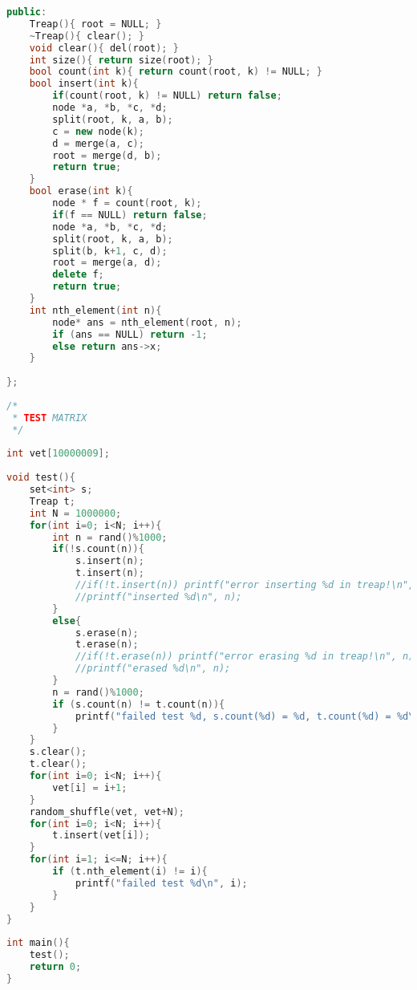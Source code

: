 \documentclass[12pt,a4paper,twoside]{report}
\begin{document}
\begin{lstlisting}[caption=Treap,language=C++]
public:
    Treap(){ root = NULL; }
    ~Treap(){ clear(); }
    void clear(){ del(root); }
    int size(){ return size(root); }
    bool count(int k){ return count(root, k) != NULL; }
    bool insert(int k){
        if(count(root, k) != NULL) return false;
        node *a, *b, *c, *d;
        split(root, k, a, b);
        c = new node(k);
        d = merge(a, c);
        root = merge(d, b);
        return true;
    }
    bool erase(int k){
        node * f = count(root, k);
        if(f == NULL) return false;
        node *a, *b, *c, *d;
        split(root, k, a, b);
        split(b, k+1, c, d);
        root = merge(a, d);
        delete f;
        return true;
    }
    int nth_element(int n){
        node* ans = nth_element(root, n);
        if (ans == NULL) return -1;
        else return ans->x;
    }
 
};
 
/*
 * TEST MATRIX
 */
 
int vet[10000009];
 
void test(){
    set<int> s;
    Treap t;
    int N = 1000000;
    for(int i=0; i<N; i++){
        int n = rand()%1000;
        if(!s.count(n)){
            s.insert(n);
            t.insert(n);
            //if(!t.insert(n)) printf("error inserting %d in treap!\n", n);
            //printf("inserted %d\n", n);
        }
        else{
            s.erase(n);
            t.erase(n);
            //if(!t.erase(n)) printf("error erasing %d in treap!\n", n);
            //printf("erased %d\n", n);
        }
        n = rand()%1000;
        if (s.count(n) != t.count(n)){
            printf("failed test %d, s.count(%d) = %d, t.count(%d) = %d\n", i, n, s.count(n), n, t.count(n));
        }
    }
    s.clear();
    t.clear();
    for(int i=0; i<N; i++){
        vet[i] = i+1;
    }
    random_shuffle(vet, vet+N);
    for(int i=0; i<N; i++){
        t.insert(vet[i]);
    }
    for(int i=1; i<=N; i++){
        if (t.nth_element(i) != i){
            printf("failed test %d\n", i);
        }
    }
}
 
int main(){
    test();
    return 0;
}
\end{lstlisting}
\end{document}

